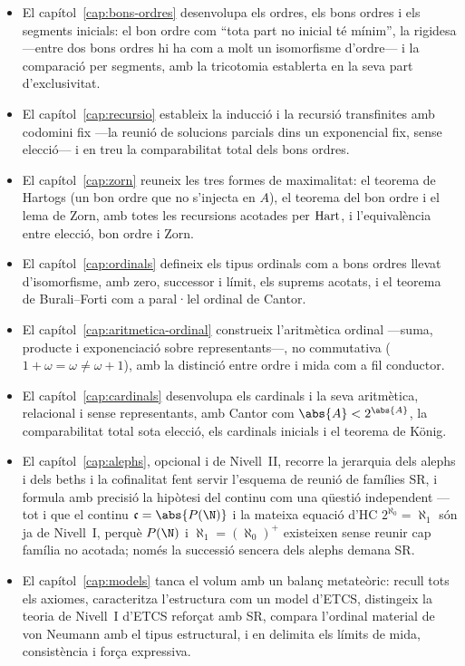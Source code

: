 \begin{itemize}
  \item El capítol~\ref{cap:bons-ordres} desenvolupa els ordres, els bons ordres i els segments inicials: el bon ordre com \enquote{tota part no inicial té mínim}, la rigidesa ---entre dos bons ordres hi ha com a molt un isomorfisme d'ordre--- i la comparació per segments, amb la tricotomia establerta en la seva part d'exclusivitat.
  \item El capítol~\ref{cap:recursio} estableix la inducció i la recursió transfinites amb codomini fix ---la reunió de solucions parcials dins un exponencial fix, sense elecció--- i en treu la comparabilitat total dels bons ordres.
  \item El capítol~\ref{cap:zorn} reuneix les tres formes de maximalitat: el teorema de Hartogs (un bon ordre que no s'injecta en $A$), el teorema del bon ordre i el lema de Zorn, amb totes les recursions acotades per $\operatorname{Hart}$, i l'equivalència entre elecció, bon ordre i Zorn.
  \item El capítol~\ref{cap:ordinals} defineix els tipus ordinals com a bons ordres llevat d'isomorfisme, amb zero, successor i límit, els suprems acotats, i el teorema de Burali--Forti com a paral·lel ordinal de Cantor.
  \item El capítol~\ref{cap:aritmetica-ordinal} construeix l'aritmètica ordinal ---suma, producte i exponenciació sobre representants---, no commutativa ($1+\omega=\omega\neq\omega+1$), amb la distinció entre ordre i mida com a fil conductor.
  \item El capítol~\ref{cap:cardinals} desenvolupa els cardinals i la seva aritmètica, relacional i sense representants, amb Cantor com $\abs{A}<2^{\abs{A}}$, la comparabilitat total sota elecció, els cardinals inicials i el teorema de König.
  \item El capítol~\ref{cap:alephs}, opcional i de Nivell~II, recorre la jerarquia dels alephs i dels beths i la cofinalitat fent servir l'esquema de reunió de famílies SR, i formula amb precisió la hipòtesi del continu com una qüestió independent ---tot i que el continu $\mathfrak c=\abs{P(\N)}$ i la mateixa equació d'HC $2^{\aleph_0}=\aleph_1$ són ja de Nivell~I, perquè $P(\N)$ i $\aleph_1=(\aleph_0)^+$ existeixen sense reunir cap família no acotada; només la successió sencera dels alephs demana SR.
  \item El capítol~\ref{cap:models} tanca el volum amb un balanç metateòric: recull tots els axiomes, caracteritza l'estructura com un model d'ETCS, distingeix la teoria de Nivell~I d'ETCS reforçat amb SR, compara l'ordinal material de von Neumann amb el tipus estructural, i en delimita els límits de mida, consistència i força expressiva.
\end{itemize}

